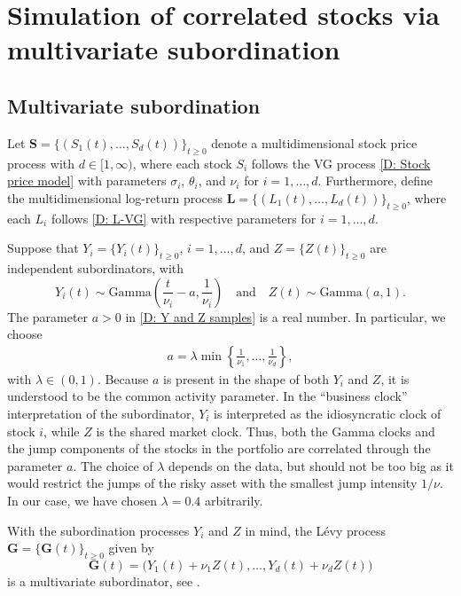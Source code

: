 \section{Simulation of correlated stocks via multivariate subordination}
\subsection{Multivariate subordination}
Let $\mathbf{S}=\{(S_1(t), \ldots, S_d(t))\}_{t \geq 0}$ denote a multidimensional stock price process with $d \in [1,\infty)$, where each stock $S_i$ follows the VG process \eqref{D: Stock price model} with parameters $\sigma_i$, $\theta_i$, and $\nu_i$ for $i=1,\ldots,d$. Furthermore, define the multidimensional log-return process $\mathbf{L}=\{(L_1(t), \ldots, L_d(t))\}_{t \geq 0}$, where each $L_i$ follows \eqref{D: L-VG} with respective parameters for $i=1,\ldots,d$. 

Suppose that $Y_i = \{Y_i(t)\}_{t \geq 0}$, $i=1, \ldots,d$, and $Z = \{Z(t)\}_{t \geq 0}$ are independent subordinators, with
\begin{equation}
    Y_i(t) \sim \text{Gamma}\left( \frac{t}{\nu_i}-a, \frac{1}{\nu_i} \right) \quad \text{and} \quad Z(t) \sim \text{Gamma}\left( a,1 \right).
    \label{D: Y and Z samples}
\end{equation}
The parameter $a > 0$ in \eqref{D: Y and Z samples} is a real number. In particular, we choose
\begin{align*}
    a = \lambda \min \left\{ \frac{1}{\nu_1}, \ldots, \frac{1}{\nu_d} \right\},
\end{align*}
with $\lambda \in (0,1)$. Because $a$ is present in the shape of both $Y_i$ and $Z$, it is understood to be the common activity parameter. In the ``business clock'' interpretation of the subordinator, $Y_i$ is interpreted as the idiosyncratic clock of stock $i$, while $Z$ is the shared market clock. Thus, both the Gamma clocks and the jump components of the stocks in the portfolio are correlated through the parameter $a$. The choice of $\lambda$ depends on the data, but should not be too big as it would restrict the jumps of the risky asset with the smallest jump intensity $1/\nu$. In our case, we have chosen $\lambda = 0.4$ arbitrarily.

With the subordination processes $Y_i$ and $Z$ in mind, the Lévy process $\mathbf{G} = \{\mathbf{G}(t)\}_{t \geq 0}$ given by
\begin{equation*}
    \mathbf{G}(t) = \big(Y_1(t) + \nu_1 Z(t), \ldots, Y_d(t) + \nu_d Z(t)\big)
\end{equation*}
is a multivariate subordinator, see \cite{LUCIANO20101937}. 

